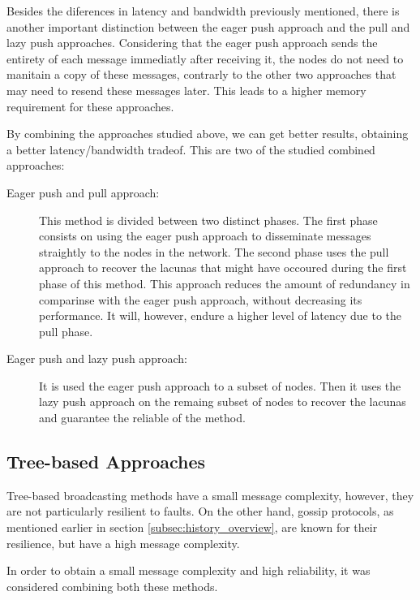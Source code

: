 Besides the diferences in latency and bandwidth previously mentioned, there is another important
distinction between the eager push approach and the pull and lazy push approaches.
Considering that the eager push approach sends the entirety of each message immediatly after
receiving it, the nodes do not need to manitain a copy of these messages, contrarly to the
other two approaches that may need to resend these messages later. This leads to a higher
memory requirement for these approaches\cite{Leitao2012}.

By combining the approaches studied above, we can get better results, obtaining a better
latency/bandwidth tradeof. This are two of the studied combined approaches\cite{Carvalho2007}:
\begin{description}
    \item[Eager push and pull approach:] This method is divided between two distinct phases.
        The first phase consists on using the eager push approach to disseminate messages
        straightly to the nodes in the network. The second phase uses the pull approach to
        recover the lacunas that might have occoured during the first phase of this method.
        This approach reduces the amount of redundancy in comparinse with the eager push
        approach, without decreasing its performance. It will, however, endure a higher level
        of latency due to the pull phase.
    \item[Eager push and lazy push approach:] It is used the eager push approach to a subset of
        nodes. Then it uses the lazy push approach on the remaing subset of nodes to recover
        the lacunas and guarantee the reliable of the method.
\end{description}

\subsection{Tree-based Approaches}
Tree-based broadcasting methods have a small message complexity, however, they are not
particularly resilient to faults. On the other hand, gossip protocols, as mentioned earlier
in section \ref{subsec:history_overview}, are known for their resilience, but have a high
message complexity\cite{Leitao2007Tree}.

In order to obtain a small message complexity and high reliability, it was considered
combining both these methods.

